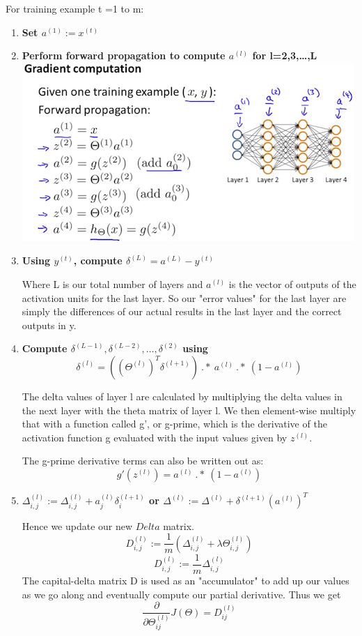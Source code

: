 \documentclass{article}
\begin{document}
For training example t =1 to m:
\begin{enumerate}
	\item \textbf{Set $a^{(1)} := x^{(t)}$}
	\item \textbf{Perform forward propagation to compute $a^{(l)}$ for l=2,3,…,L}\\
	\includegraphics[scale=0.65]{Forward_propagation.png}
	\item \textbf{Using $y^{(t)}$, compute $\delta^{(L)} = a^{(L)} - y^{(t)}$}
	
	Where L is our total number of layers and $a^{(l)}$ is the vector of outputs of the activation units for the last layer. So our "error values" for the last layer are simply the differences of our actual results in the last layer and the correct outputs in y.
	\item \textbf{Compute $\delta^{(L-1)}, \delta^{(L-2)},\dots,\delta^{(2)}$ using $$\delta^{(l)} = ((\Theta^{(l)})^T \delta^{(l+1)})\ .*\ a^{(l)}\ .*\ (1 - a^{(l)})$$}
	
	The delta values of layer l are calculated by multiplying the delta values in the next layer with the theta matrix of layer l. We then element-wise multiply that with a function called g', or g-prime, which is the derivative of the activation function g evaluated with the input values given by $z^{(l)}$.
	
	The g-prime derivative terms can also be written out as:
	$$g'(z^{(l)}) = a^{(l)}\ .*\ (1 - a^{(l)})$$
	\item \textbf{$\Delta^{(l)}_{i,j} := \Delta^{(l)}_{i,j} + a_j^{(l)} \delta_i^{(l+1)}$ or $\Delta^{(l)} := \Delta^{(l)} + \delta^{(l+1)}(a^{(l)})^T$}
	
	Hence we update our new $Delta$ matrix.
	$$D^{(l)}_{i,j} := \dfrac{1}{m}\left(\Delta^{(l)}_{i,j} + \lambda\Theta^{(l)}_{i,j}\right)$$
	$$D^{(l)}_{i,j} := \dfrac{1}{m}\Delta^{(l)}_{i,j}$$
	The capital-delta matrix D is used as an "accumulator" to add up our values as we go along and eventually compute our partial derivative. Thus we get $$\frac \partial {\partial \Theta_{ij}^{(l)}} J(\Theta) = D_{ij}^{(l)}$$
	
\end{enumerate}
\end{document}
